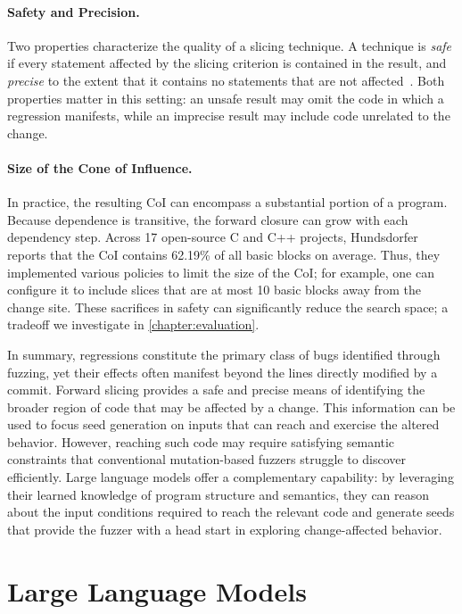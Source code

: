 \paragraph{Safety and Precision.}
Two properties characterize the quality of a slicing technique. A technique is
\emph{safe} if every statement affected by the slicing criterion is contained in
the result, and \emph{precise} to the extent that it contains no statements that
are not affected~\cite{alomariSrcSliceVeryEfficient2014}. Both properties matter
in this setting: an unsafe result may omit the code in which a regression
manifests, while an imprecise result may include code unrelated to the change.

\paragraph{Size of the Cone of Influence.}
In practice, the resulting \ac{CoI} can encompass a substantial portion of a
program. Because dependence is transitive, the forward closure can grow with
each dependency step. Across 17 open-source C and C++ projects,
Hundsdorfer~\cite{zotero-item-324} reports that the \ac{CoI} contains 62.19\% of
all basic blocks on average. Thus, they implemented various policies to limit the size of the \ac{CoI}; for example, one can configure it to include slices that are at most 10 basic blocks away from the change site. These sacrifices in safety can significantly reduce the search space; a tradeoff we investigate in \cref{chapter:evaluation}.

\bigskip
In summary, regressions constitute the primary class of bugs identified through fuzzing, yet
their effects often manifest beyond the lines directly modified by a commit.
Forward slicing provides a safe and precise means of identifying the broader region of code that may be affected by a change. This information can be used to focus seed
generation on inputs that can reach and exercise the altered behavior. However,
reaching such code may require satisfying semantic constraints that conventional
mutation-based fuzzers struggle to discover efficiently. Large language models
offer a complementary capability: by leveraging their learned knowledge of
program structure and semantics, they can reason about the input conditions
required to reach the relevant code and generate seeds that provide the fuzzer with
a head start in exploring change-affected behavior.

\section{Large Language Models}
\label{sec:llms}

